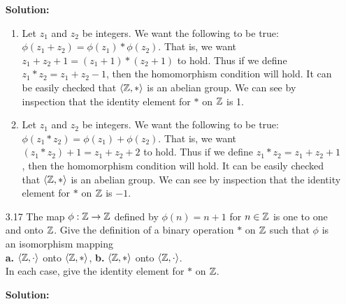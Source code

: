 \begin{enumerate}
      \textbf{Solution:}

      \begin{enumerate}
         \item Let $z_1$ and $z_2$ be integers. We want the following to be
               true: $\phi(z_1 + z_2) = \phi(z_1) * \phi(z_2)$. That is, we want
               $z_1 + z_2 + 1 = (z_1 + 1) * (z_2 + 1)$ to hold. Thus if we 
               define $z_1 * z_2 = z_1 + z_2 - 1$, then the homomorphism 
               condition will hold. It can be easily checked that $\langle \mathbb{Z}, * \rangle$ 
               is an abelian group. We can see by inspection that the identity 
               element for $*$ on $\mathbb{Z}$ is 1.
         \item Let $z_1$ and $z_2$ be integers. We want the following to be
               true: $\phi(z_1 * z_2) = \phi(z_1) + \phi(z_2)$. That is, we want
               $(z_1 * z_2) + 1 = z_1 + z_2 + 2$ to hold. Thus if we 
               define $z_1 * z_2 = z_1 + z_2 + 1$, then the homomorphism 
               condition will hold. It can be easily checked that $\langle \mathbb{Z}, * \rangle$ 
               is an abelian group. We can see by inspection that the identity 
               element for $*$ on $\mathbb{Z}$ is $-1$.
      \end{enumerate}
   \item[3.17] The map $\phi : \mathbb{Z} \rightarrow \mathbb{Z}$ defined by $\phi(n) = n + 1$
               for $n \in \mathbb{Z}$ is one to one and onto $\mathbb{Z}$. Give the definition 
               of a binary operation $*$ on $\mathbb{Z}$ such that $\phi$ is an
               isomorphism mapping \\
               \textbf{a.} $\langle \mathbb{Z}, \cdot \rangle$ onto $\langle \mathbb{Z}, * \rangle$,
               \qquad\qquad\qquad\qquad\qquad\qquad\qquad\qquad
               \textbf{b.} $\langle \mathbb{Z}, * \rangle$ onto $\langle \mathbb{Z}, \cdot \rangle$. \\
               In each case, give the identity element for $*$ on $\mathbb{Z}$.

      \textbf{Solution:}


\end{enumerate}
